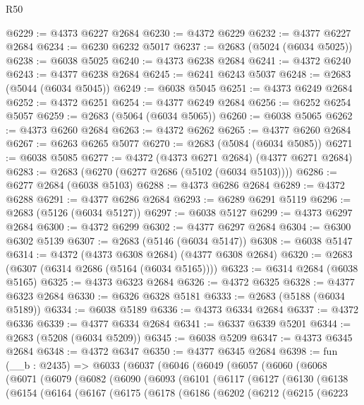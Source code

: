 \begin{lexlean}{R50}
\begin{coremodule}
@6229 := @4373 @6227 @2684
@6230 := @4372 @6229
@6232 := @4377 @6227 @2684
@6234 := @6230 @6232 @5017
@6237 := @2683 (@5024 (@6034 @5025))
@6238 := @6038 @5025
@6240 := @4373 @6238 @2684
@6241 := @4372 @6240
@6243 := @4377 @6238 @2684
@6245 := @6241 @6243 @5037
@6248 := @2683 (@5044 (@6034 @5045))
@6249 := @6038 @5045
@6251 := @4373 @6249 @2684
@6252 := @4372 @6251
@6254 := @4377 @6249 @2684
@6256 := @6252 @6254 @5057
@6259 := @2683 (@5064 (@6034 @5065))
@6260 := @6038 @5065
@6262 := @4373 @6260 @2684
@6263 := @4372 @6262
@6265 := @4377 @6260 @2684
@6267 := @6263 @6265 @5077
@6270 := @2683 (@5084 (@6034 @5085))
@6271 := @6038 @5085
@6277 := @4372 (@4373 @6271 @2684) (@4377 @6271 @2684)
@6283 := @2683 (@6270 (@6277 @2686 (@5102 (@6034 @5103))))
@6286 := @6277 @2684 (@6038 @5103)
@6288 := @4373 @6286 @2684
@6289 := @4372 @6288
@6291 := @4377 @6286 @2684
@6293 := @6289 @6291 @5119
@6296 := @2683 (@5126 (@6034 @5127))
@6297 := @6038 @5127
@6299 := @4373 @6297 @2684
@6300 := @4372 @6299
@6302 := @4377 @6297 @2684
@6304 := @6300 @6302 @5139
@6307 := @2683 (@5146 (@6034 @5147))
@6308 := @6038 @5147
@6314 := @4372 (@4373 @6308 @2684) (@4377 @6308 @2684)
@6320 := @2683 (@6307 (@6314 @2686 (@5164 (@6034 @5165))))
@6323 := @6314 @2684 (@6038 @5165)
@6325 := @4373 @6323 @2684
@6326 := @4372 @6325
@6328 := @4377 @6323 @2684
@6330 := @6326 @6328 @5181
@6333 := @2683 (@5188 (@6034 @5189))
@6334 := @6038 @5189
@6336 := @4373 @6334 @2684
@6337 := @4372 @6336
@6339 := @4377 @6334 @2684
@6341 := @6337 @6339 @5201
@6344 := @2683 (@5208 (@6034 @5209))
@6345 := @6038 @5209
@6347 := @4373 @6345 @2684
@6348 := @4372 @6347
@6350 := @4377 @6345 @2684
@6398 := fun (__b : @2435) =>
  @6033
    (@6037
      (@6046
        (@6049
          (@6057
            (@6060
              (@6068
                (@6071
                  (@6079
                    (@6082
                      (@6090
                        (@6093
                          (@6101
                            (@6117
                              (@6127
                                (@6130
                                  (@6138
                                    (@6154
                                      (@6164
                                        (@6167
                                          (@6175
                                            (@6178
                                              (@6186
                                                (@6202
                                                  (@6212
                                                    (@6215
                                                      (@6223

\end{coremodule}
\end{lexlean}

